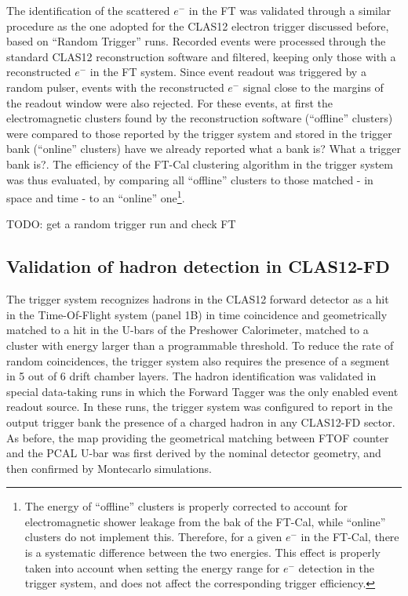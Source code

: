 The identification of the scattered $e^-$ in the FT was validated through a similar procedure as the one adopted for the CLAS12 electron trigger discussed before, based on ``Random Trigger'' runs. Recorded events were processed through the standard CLAS12 reconstruction software and filtered, keeping only those with a reconstructed $e^-$ in the FT system. Since event readout was triggered by a random pulser, events with the reconstructed $e^-$ signal close to the margins of the readout window were also rejected.
For these events, at first the electromagnetic clusters found by the reconstruction software (``offline'' clusters) were compared to those reported by the trigger system and stored in the trigger bank (``online'' clusters) {\color{red} have we already reported what a bank is? What a trigger bank is?}. The efficiency of the FT-Cal clustering algorithm in the trigger system was thus evaluated, by comparing all ``offline'' clusters to those matched - in space and time - to an ``online'' one\footnote{The energy of ``offline'' clusters is properly corrected to account for electromagnetic shower leakage from the bak of the FT-Cal, while ``online'' clusters do not implement this. Therefore, for a given $e^-$ in the FT-Cal, there is a systematic difference between the two energies. This effect is properly taken into account when setting the energy range for $e^-$ detection in the trigger system, and does not affect the corresponding trigger efficiency.}.

{\color{blue} TODO: get a random trigger run and check FT}

\subsection{Validation of hadron detection in CLAS12-FD}

The trigger system recognizes hadrons in the CLAS12 forward detector as a hit in the Time-Of-Flight system (panel 1B) in time coincidence and geometrically matched to a hit in the U-bars of the Preshower Calorimeter, matched to a cluster with energy larger than a programmable threshold. To reduce the rate of random coincidences, the trigger system also requires the presence of a segment in 5 out of 6 drift chamber layers. The hadron identification was validated in special data-taking runs in which the Forward Tagger was the only enabled event readout source. In these runs, the trigger system was configured to report in the output trigger bank the presence of a charged hadron in any CLAS12-FD sector. As before, the map providing the geometrical matching between FTOF counter and the PCAL U-bar was first derived by the nominal detector geometry, and then confirmed by Montecarlo simulations.

